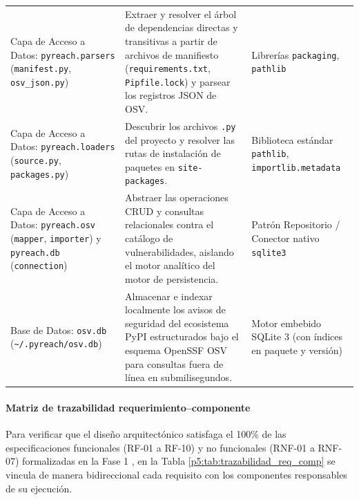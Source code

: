 \begin{table}[H]
\begin{tabularx}{\textwidth}{p{4.2cm} X p{3.2cm}}
Capa de Acceso a Datos: \texttt{pyreach.\allowbreak parsers} (\texttt{manifest.\allowbreak py}, \texttt{osv\_\allowbreak json.\allowbreak py}) & 
Extraer y resolver el árbol de dependencias directas y transitivas a partir de archivos de manifiesto (\texttt{requirements.\allowbreak txt}, \texttt{Pipfile.\allowbreak lock}) y parsear los registros JSON de OSV. & 
Librerías \texttt{packaging}, \texttt{pathlib} \\
\addlinespace
Capa de Acceso a Datos: \texttt{pyreach.\allowbreak loaders} (\texttt{source.\allowbreak py}, \texttt{packages.\allowbreak py}) & 
Descubrir los archivos \texttt{.\allowbreak py} del proyecto y resolver las rutas de instalación de paquetes en \texttt{site-\allowbreak packages}. & 
Biblioteca estándar \texttt{pathlib}, \texttt{importlib.\allowbreak metadata} \\
\addlinespace
Capa de Acceso a Datos: \texttt{pyreach.\allowbreak osv} (\texttt{mapper}, \texttt{importer}) y \texttt{pyreach.\allowbreak db} (\texttt{connection}) & 
Abstraer las operaciones CRUD y consultas relacionales contra el catálogo de vulnerabilidades, aislando el motor analítico del motor de persistencia. & 
Patrón Repositorio / Conector nativo \texttt{sqlite3} \\
\addlinespace
Base de Datos: \texttt{osv.\allowbreak db} (\texttt{\textasciitilde/\allowbreak .\allowbreak pyreach/\allowbreak osv.\allowbreak db}) & 
Almacenar e indexar localmente los avisos de seguridad del ecosistema PyPI estructurados bajo el esquema OpenSSF OSV para consultas fuera de línea en submilisegundos. & 
Motor embebido SQLite 3 (con índices en paquete y versión) \\
\bottomrule
\end{tabularx}
\end{table}

\paragraph*{Matriz de trazabilidad requerimiento--componente}
Para verificar que el diseño arquitectónico satisfaga el 100\% de las especificaciones funcionales (RF-01 a RF-10) y no funcionales (RNF-01 a RNF-07) formalizadas en la Fase 1 \cite{iso2018req, wiegers2013software}, en la Tabla \ref{p5:tab:trazabilidad_req_comp} se vincula de manera bidireccional cada requisito con los componentes responsables de su ejecución.

